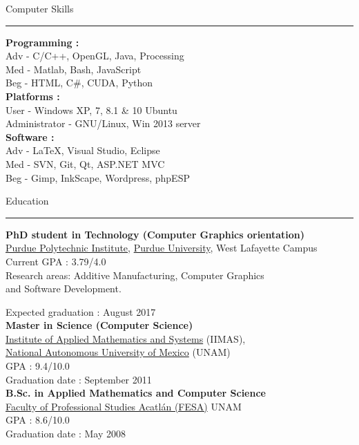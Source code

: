 \documentclass[letterpaper,10pt]{article}
\begin{document}
\begin{minipage}{0.40\textwidth}
\vspace*{-0.5cm}
 {\large{Computer Skills}} \\
 \textcolor{Dandelion}{\rule{0.5\textwidth}{0.05in}} 

\textbf{Programming :} \\
Adv - C/C++, OpenGL, Java, Processing \\
Med - Matlab, Bash, JavaScript \\
Beg - HTML, C\#, CUDA, Python\\

\textbf{Platforms :} \\
User - Windows XP, 7, 8.1 \& 10 Ubuntu \\
Administrator - GNU/Linux, Win 2013 server\\

\textbf{Software :} \\
Adv - \LaTeX, Visual Studio, Eclipse \\
Med - SVN, Git, Qt, ASP.NET MVC \\
Beg - Gimp, InkScape,  Wordpress, phpESP\\
\end{minipage}
%
\hspace{0.025\textwidth}
%
\begin{minipage}{0.70\textwidth} 
\vspace*{1.0cm}
{\centering \large{{Education}}} \\
\textcolor{Dandelion}{\rule{0.4\textwidth}{0.05in}}

\textbf{PhD student in Technology (Computer Graphics orientation)} \\
\href{http://polytechnic.purdue.edu/}{Purdue Polytechnic Institute}, \href{http://www.purdue.edu/}{Purdue University}, West Lafayette Campus \\
Current GPA : 3.79/4.0 \\
Research areas: Additive Manufacturing, Computer Graphics \\and Software Development.

Expected graduation : August 2017 \\

\textbf{Master in Science (Computer Science)} \\
\href{http://www.iimas.unam.mx/}{Institute of Applied Mathematics and Systems} (IIMAS), \\ \href{http://www.unam.mx/}{National Autonomous University of Mexico} (UNAM) \\
GPA : 9.4/10.0 \\
Graduation date : September 2011 \\

\textbf{B.Sc. in Applied Mathematics and Computer Science} \\
\href{http://www.acatlan.unam.mx/}{Faculty of Professional Studies Acatl\'{a}n (FESA)} UNAM \\
GPA : 8.6/10.0 \\
Graduation date : May 2008\\
\end{minipage} 
\end{document}
